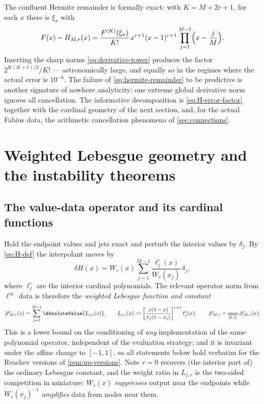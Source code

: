 \documentclass[11pt,oneside]{article}
\numberwithin{equation}{section}
\theoremstyle{definition}
\theoremstyle{remark}
\newcommand{\Leb}{\mathscr L}
\begin{document}
The confluent Hermite remainder is formally exact: with
$K=M+2r+1$, for each $x$ there is $\xi_x$ with
\begin{equation}
 F(x)-H_{M,r}(x)
 =\frac{F^{(K)}(\xi_x)}{K!}\,
 x^{r+1}(x-1)^{r+1}\prod_{j=1}^{M-1}\Bigl(x-\frac jM\Bigr).
 \label{eq:hermite-remainder}
\end{equation}
Inserting the sharp norms \eqref{eq:derivative-tower} produces the
factor $2^{K(K+1)/2}/K!$ --- astronomically large, and equally so in
the regimes where the actual error is $10^{-6}$.  The failure of
\eqref{eq:hermite-remainder} to be predictive is another signature of
nowhere analyticity: one extreme global derivative norm ignores all
cancellation.  The informative decomposition is
\eqref{eq:H-error-factor} together with the cardinal geometry of the
next section, and, for the actual Fabius data, the arithmetic
cancellation phenomena of \cref{sec:connections}.

\section{Weighted Lebesgue geometry and the instability theorems}
\label{sec:conditioning}

\subsection{The value-data operator and its cardinal functions}

Hold the endpoint values and jets exact and perturb the interior
values by $\delta_j$.  By \eqref{eq:H-def} the interpolant moves by
\begin{equation}
 \delta H(x)=W_r(x)\sum_{j=1}^{M-1}
 \frac{\ell^{\circ}_j(x)}{W_r(x_j)}\,\delta_j,
 \label{eq:perturbation}
\end{equation}
where $\ell^{\circ}_j$ are the interior cardinal polynomials.  The
relevant operator norm from $\ell^\infty$ data is therefore the
\emph{weighted Lebesgue function and constant}
\begin{equation}
 \Leb_{M,r}(x)=\sum_{j=1}^{M-1}
 \AbsoluteValue{L_{j,r}(x)},
 \qquad
 L_{j,r}(x):=\left[\frac{x(1-x)}{x_j(1-x_j)}\right]^{r+1}
 \ell^{\circ}_j(x),
 \qquad
 \Leb_{M,r}=\max_{[0,1]}\Leb_{M,r}(x).
 \label{eq:weighted-lebesgue}
\end{equation}
This is a lower bound on the conditioning of \emph{any}
implementation of the same polynomial operator, independent of the
evaluation strategy; and it is invariant under the affine change to
$[-1,1]$, so all statements below hold verbatim for the Rvachev
versions of \cref{rem:up-versions}.  Note $r=0$ recovers (the
interior part of) the ordinary Lebesgue constant, and the weight
ratio in $L_{j,r}$ is the two-sided competition in miniature:
$W_r(x)$ \emph{suppresses} output near the endpoints while
$W_r(x_j)^{-1}$ \emph{amplifies} data from nodes near them.
\end{document}
